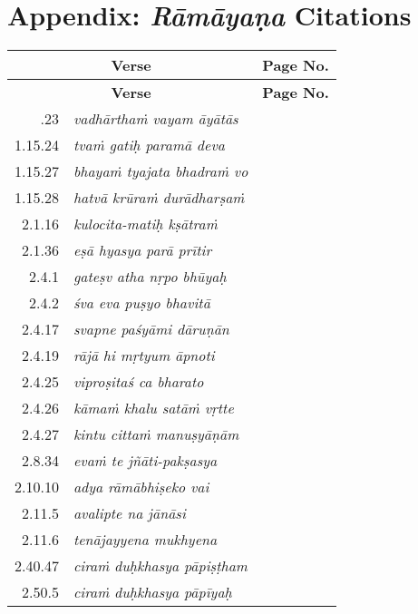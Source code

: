 \chapter*{Appendix: {\sl\bfseries Rāmāyaṇa} Citations}\label{rc}


{\renewcommand{\arraystretch}{1.2}
\begin{longtable}{rlc}
\hline
\multicolumn{2}{c}{\bf Verse} & {\bf Page No.}\\
\hline
\endfirsthead
\hline
\multicolumn{2}{c}{\bf Verse} & {\bf Page No.}\\
\hline
\endhead
\hline
\endfoot
\hline
\endlastfoot
1.15.23 & {\sl vadhārthaṁ vayam āyātās} & \pageref{verse1}\\
1.15.24 & {\sl tvaṁ gatiḥ paramā deva} & \pageref{verse2}\\
1.15.27 & {\sl bhayaṁ tyajata bhadraṁ vo} & \pageref{verse3}\\
1.15.28 & {\sl hatvā krūraṁ durādharṣaṁ} & \pageref{verse4}\\
2.1.16 & {\sl kulocita-matiḥ kṣātraṁ} & \pageref{verse5}\\
2.1.36 & {\sl eṣā hyasya parā prītir} & \pageref{verse6}\\
2.4.1 & {\sl gateṣv atha nṛpo bhūyaḥ} & \pageref{verse7}\\
2.4.2 & {\sl śva eva puṣyo bhavitā} & \pageref{verse8}\\
2.4.17 & {\sl svapne paśyāmi dāruṇān} & \pageref{verse9}\\
2.4.19 & {\sl rājā hi mṛtyum āpnoti} & \pageref{verse10}\\
2.4.25 & {\sl viproṣitaś ca bharato} & \pageref{verse11}\\
2.4.26 & {\sl kāmaṁ khalu satāṁ vṛtte} & \pageref{verse12}\\
2.4.27 & {\sl kintu cittaṁ manuṣyāṇām} & \pageref{verse13}\\
2.8.34 & {\sl evaṁ te jñāti-pakṣasya} & \pageref{verse14}\\
2.10.10 & {\sl adya rāmābhiṣeko vai} & \pageref{verse15}\\
2.11.5 & {\sl avalipte na jānāsi} & \pageref{verse16}\\
2.11.6 & {\sl tenājayyena mukhyena} & \pageref{verse17}\\
2.40.47 & {\sl ciraṁ duḥkhasya pāpiṣṭham} & \pageref{verse18}\\ 
2.50.5 & {\sl ciraṁ duḥkhasya pāpīyaḥ} & \pageref{verse19}\\

\end{longtable}}
